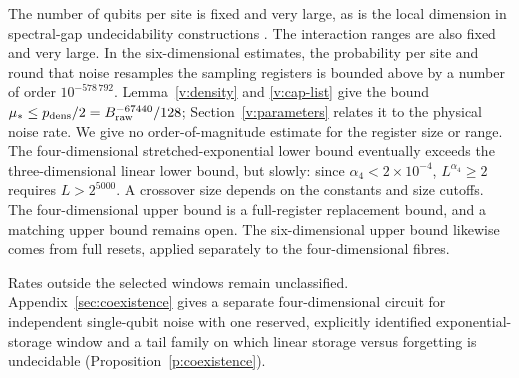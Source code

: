 The number of qubits per site is fixed and very large, as is the local dimension in spectral-gap undecidability constructions \cite{CPGW2015}. The interaction ranges are also fixed and very large. In the six-dimensional estimates, the probability per site and round that noise resamples the sampling registers is bounded above by a number of order \(10^{-578\,792}\). Lemma~\ref{v:density} and \eqref{v:cap-list} give the bound \(\mu_*\le p_{\rm dens}/2=B_{\rm raw}^{-67440}/128\); Section~\ref{v:parameters} relates it to the physical noise rate. We give no order-of-magnitude estimate for the register size or range. The four-dimensional stretched-exponential lower bound eventually exceeds the three-dimensional linear lower bound, but slowly: since \(\alpha_4<2\times10^{-4}\), \(L^{\alpha_4}\ge2\) requires \(L>2^{5000}\). A crossover size depends on the constants and size cutoffs. The four-dimensional upper bound is a full-register replacement bound, and a matching upper bound remains open. The six-dimensional upper bound likewise comes from full resets, applied separately to the four-dimensional fibres.

Rates outside the selected windows remain unclassified. Appendix~\ref{sec:coexistence} gives a separate four-dimensional circuit for independent single-qubit noise with one reserved, explicitly identified exponential-storage window and a tail family on which linear storage versus forgetting is undecidable (Proposition~\ref{p:coexistence}).
